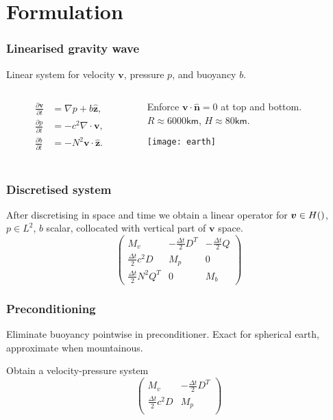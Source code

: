 \documentclass[presentation]{beamer}
\renewcommand{\vec}[1]{\ensuremath{\boldsymbol{#1}}}
\newcommand{\ddt}[1]{\frac{\partial #1}{\partial t}}
\newcommand{\zhat}{\hat{\vec{z}}}
\let\div\relax
\DeclareMathOperator{\div}{div}
\begin{document}
\section{Formulation}

\begin{frame}
  \frametitle{Linearised gravity wave}
  Linear system for velocity $\vec{v}$, pressure $p$, and buoyancy $b$.
\vspace{2em}

  \begin{columns}
    \begin{column}{0.4\textwidth}
      \begin{align*}
        \ddt{\vec{v}} &= \nabla p + b \zhat, \\
        \ddt{p} &= -c^2 \nabla\cdot \vec{v}, \\
        \ddt{b} &= -N^2\vec{v}\cdot\zhat.\\
      \end{align*}
    \end{column}
    \begin{column}{0.6\textwidth}
      Enforce $\vec{v}\cdot \hat{\vec{n}} = 0$ at top and bottom.\\
      $R\approx 6000\textsf{km}$, $H\approx 80\textsf{km}$. \\
      \begin{center}
        \texttt{[image: earth]}
      \end{center}
    \end{column}
  \end{columns}
\end{frame}

\begin{frame}
  \frametitle{Discretised system}
  After discretising in space and time we obtain a linear operator for
  $\vec{v} \in H(\div)$, $p \in L^2$, $b$ scalar, collocated with
  vertical part of $\vec{v}$ space.
\begin{equation*}
\begin{pmatrix}
  M_v &
    -\frac{\Delta t}{2}D^T &
    -\frac{\Delta t}{2}Q\\[1ex]
  \frac{\Delta t}{2}c^2D & M_p & 0\\[1ex]
  \frac{\Delta t}{2}N^2Q^T & 0 & M_b
\end{pmatrix}
\end{equation*}
\end{frame}

\begin{frame}
  \frametitle{Preconditioning}
  Eliminate buoyancy pointwise in preconditioner.  Exact for spherical earth,
  approximate when mountainous.

  Obtain a velocity-pressure system
\begin{equation*}
\begin{pmatrix}
  M_v & -\frac{\Delta t}{2}D^T\\
  \frac{\Delta t}{2}c^2D & M_p\\
\end{pmatrix}
\end{equation*}

\end{frame}
\end{document}
